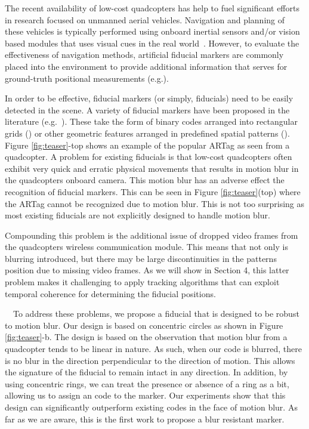 \documentclass[runningheads]{llncs}
\begin{document}
The recent availability of low-cost quadcopters has help to fuel significant efforts in
research focused on unmanned aerial vehicles.  Navigation and planning of
these vehicles is typically performed using onboard inertial sensors and/or
vision based modules that uses visual cues in the real world~\cite{Davison:2007}.
However, to evaluate the effectiveness of navigation methods, artificial
fiducial markers are commonly placed into the environment to provide
additional information that serves for ground-truth
positional measurements (e.g.\cite{Bosnak:2012,Lim09,Klopschitz:2007}).

In order to be effective, fiducial markers (or simply, fiducials) need
to be easily detected in the scene.  A variety of fiducial markers
have been proposed in the literature (e.g.~\cite{NaimarkF02,ARToolkit02,Fiala05,Pitag13,runetag11}).
These take the form of binary codes arranged into rectangular grids (\cite{ARToolkit02,Fiala05})
or other geometric features arranged in predefined spatial patterns
(\cite{NaimarkF02,Pitag13,runetag11}).
Figure \ref{fig:teaser}-top shows an example of the popular ARTag\cite{Fiala05} as
seen from a quadcopter.  A problem for existing fiducials is  that low-cost quadcopters
often exhibit very quick and erratic physical movements that
results in motion blur in the quadcopters onboard camera.  This motion blur has
an adverse effect the  recognition of fiducial  markers.  This can be seen in
Figure \ref{fig:teaser}(top) where the ARTag cannot be recognized due to motion
blur. This is not too surprising as most  existing fiducials are not explicitly
designed to handle motion blur.

Compounding this problem is the additional issue of dropped video frames from the quadcopters
wireless communication module.   This means that not only is blurring
introduced, but there may be large discontinuities in the patterns position due
to missing video frames.  As we will show in Section 4, this latter problem
makes it challenging to apply tracking algorithms that can exploit temporal
coherence for determining the fiducial positions.

~~To address these problems, we propose a
fiducial that is designed to be robust to motion blur.  Our design is based on
concentric circles as shown in Figure \ref{fig:teaser}-b.  The design is based
on the observation that motion blur from a quadcopter tends to be linear in
nature.  As such, when our code is blurred, there is no blur in the direction
perpendicular to the direction of motion.   This allows the signature of the
fiducial to remain intact in any direction.  In addition, by using concentric
rings, we can treat the presence or absence of a ring as a bit, allowing us to
assign an code to the marker.  Our experiments show that this design can
significantly outperform existing codes in the face of motion blur. As far as
we are aware, this is the first work to propose a blur resistant marker.
\end{document}
